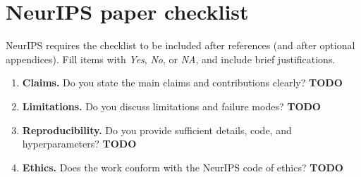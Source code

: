 \documentclass{article}
\begin{document}
\section{NeurIPS paper checklist}
NeurIPS requires the checklist to be included after references (and after optional appendices). Fill items with \emph{Yes}, \emph{No}, or \emph{NA}, and include brief justifications.
\begin{enumerate}
  \item \textbf{Claims.} Do you state the main claims and contributions clearly? \textbf{TODO}
  \item \textbf{Limitations.} Do you discuss limitations and failure modes? \textbf{TODO}
  \item \textbf{Reproducibility.} Do you provide sufficient details, code, and hyperparameters? \textbf{TODO}
  \item \textbf{Ethics.} Does the work conform with the NeurIPS code of ethics? \textbf{TODO}
\end{enumerate}
\end{document}

